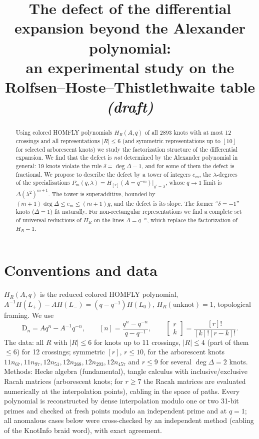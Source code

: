\documentclass[11pt]{article}
\title{The defect of the differential expansion beyond the Alexander polynomial:\\
an experimental study on the Rolfsen--Hoste--Thistlethwaite table\\[2mm]
\large\emph{(draft)}}
\author{}
\date{}
\theoremstyle{definition}
\theoremstyle{remark}
\newcommand{\D}{\mathrm{D}}
\newcommand{\qbin}[2]{\left[\begin{smallmatrix}#1\\#2\end{smallmatrix}\right]}
\begin{document}
\maketitle

\begin{abstract}
Using colored HOMFLY polynomials $H_R(A,q)$ of all $2893$ knots with at most 12 crossings
and all representations $|R|\le 6$ (and symmetric representations up to $[10]$ for selected
arborescent knots) we study the factorization structure of the differential expansion.
We find that the defect is \emph{not} determined by the Alexander polynomial in general:
19 knots violate the rule $\delta=\deg\Delta-1$, and for some of them the defect is
fractional.  We propose to describe the defect by a tower of integers $e_m$, the $\lambda$-degrees
of the specialisations $P_m(q,\lambda)=H_{[r]}(A=q^{-m})|_{q^r=\lambda}$, whose $q\to1$ limit is
$\Delta(\lambda^2)^{m+1}$.  The tower is superadditive, bounded by $(m+1)\deg\Delta\le e_m\le
(m+1)g$, and the defect is its slope.  The former ``$\delta=-1$'' knots ($\Delta=1$) fit
naturally.  For non-rectangular representations we find a complete set of universal
reductions of $H_R$ on the lines $A=q^{-n}$, which replace the factorization of $H_R-1$.
\end{abstract}

\section{Conventions and data}

$H_R(A,q)$ is the reduced colored HOMFLY polynomial,
$A^{-1}H(L_+)-AH(L_-)=(q-q^{-1})H(L_0)$, $H_R(\text{unknot})=1$, topological framing.
We use
\[
  \D_n=Aq^n-A^{-1}q^{-n},\qquad [n]=\frac{q^n-q^{-n}}{q-q^{-1}},\qquad
  \qbin{r}{k}=\frac{[r]!}{[k]![r-k]!}.
\]
The data: all $R$ with $|R|\le 6$ for knots up to 11 crossings, $|R|\le 4$ (part of them $\le6$)
for 12 crossings; symmetric $[r]$, $r\le 10$, for the arborescent knots
$11n_{67},11n_{97},12n_{51},12n_{268},12n_{293},12n_{457}$ and $r\le 9$ for several
$\deg\Delta=2$ knots.  Methods: Hecke algebra (fundamental), tangle calculus with inclusive/exclusive
Racah matrices (arborescent knots; for $r\ge7$ the Racah matrices are evaluated numerically at the
interpolation points), cabling in the space of paths.  Every polynomial is reconstructed by dense
interpolation modulo one or two 31-bit primes and checked at fresh points modulo an independent prime
and at $q=1$; all anomalous cases below were cross-checked by an independent method (cabling of the
KnotInfo braid word), with exact agreement.
\end{document}
